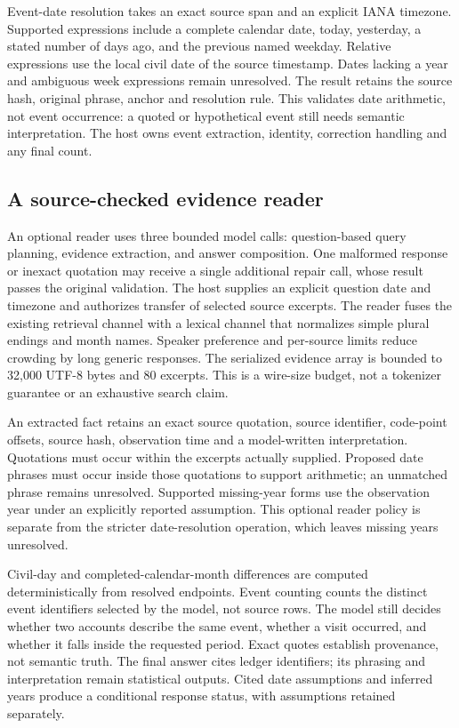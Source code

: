 \documentclass[11pt]{article}
\begin{document}
Event-date resolution takes an exact source span and an explicit IANA timezone. Supported expressions include a complete calendar date, today, yesterday, a stated number of days ago, and the previous named weekday. Relative expressions use the local civil date of the source timestamp. Dates lacking a year and ambiguous week expressions remain unresolved. The result retains the source hash, original phrase, anchor and resolution rule. This validates date arithmetic, not event occurrence: a quoted or hypothetical event still needs semantic interpretation. The host owns event extraction, identity, correction handling and any final count.

\subsection{A source-checked evidence reader}
An optional reader uses three bounded model calls: question-based query planning, evidence extraction, and answer composition. One malformed response or inexact quotation may receive a single additional repair call, whose result passes the original validation. The host supplies an explicit question date and timezone and authorizes transfer of selected source excerpts. The reader fuses the existing retrieval channel with a lexical channel that normalizes simple plural endings and month names. Speaker preference and per-source limits reduce crowding by long generic responses. The serialized evidence array is bounded to 32,000 UTF-8 bytes and 80 excerpts. This is a wire-size budget, not a tokenizer guarantee or an exhaustive search claim.

An extracted fact retains an exact source quotation, source identifier, code-point offsets, source hash, observation time and a model-written interpretation. Quotations must occur within the excerpts actually supplied. Proposed date phrases must occur inside those quotations to support arithmetic; an unmatched phrase remains unresolved. Supported missing-year forms use the observation year under an explicitly reported assumption. This optional reader policy is separate from the stricter date-resolution operation, which leaves missing years unresolved.

Civil-day and completed-calendar-month differences are computed deterministically from resolved endpoints. Event counting counts the distinct event identifiers selected by the model, not source rows. The model still decides whether two accounts describe the same event, whether a visit occurred, and whether it falls inside the requested period. Exact quotes establish provenance, not semantic truth. The final answer cites ledger identifiers; its phrasing and interpretation remain statistical outputs. Cited date assumptions and inferred years produce a conditional response status, with assumptions retained separately.
\end{document}
